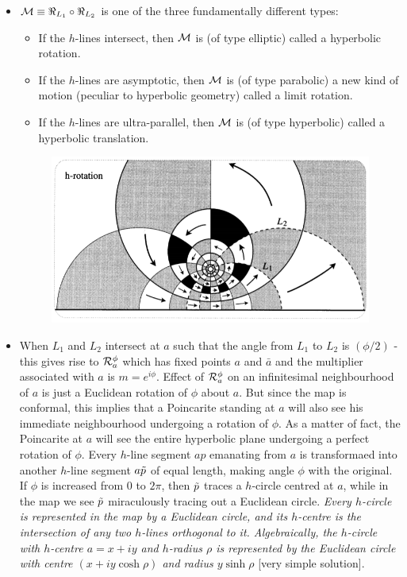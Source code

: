 \documentclass[12pt]{article}
\def\tt{\textit}
\def\mc{\ensuremath\mathcal}
\def\td{\ensuremath\tilde}
\begin{document}
\begin{itemize}
    \item $\mc{M} \equiv \Re_{L_1} \circ \Re_{L_2}$ is one of the three fundamentally different types:
    
    \begin{itemize}
        \item If the $h$-lines intersect, then $\mc{M}$ is (of type elliptic) called a hyperbolic rotation.

        \item If the $h$-lines are asymptotic, then $\mc{M}$ is (of type parabolic) a new kind of motion (peculiar to hyperbolic geometry) called a limit rotation.

        \item If the $h$-lines are ultra-parallel, then $\mc{M}$ is (of type hyperbolic) called a hyperbolic translation.
    \end{itemize}

    \begin{figure}[h!]
        \centering
        \includegraphics[scale=0.7]{fig_21}
        \label{fig_21}
    \end{figure}

    \item When $L_1$ and $L_2$ intersect at $a$ such that the angle from $L_1$ to $L_2$ is $(\phi/2)$ - this gives rise to $\mc{R}_{a}^{\phi}$ which has fixed points $a$ and $\bar{a}$ and the multiplier associated with $a$ is $m=e^{i\phi}$. Effect of $\mc{R}_{a}^{\phi}$ on an infinitesimal neighbourhood of $a$ is just a Euclidean rotation of $\phi$ about $a$. But since the map is conformal, this implies that a Poincarite standing at $a$ will also see his immediate neighbourhood undergoing a rotation of $\phi$. As a matter of fact, the Poincarite at $a$ will see the entire hyperbolic plane undergoing a perfect rotation of $\phi$. Every $h$-line segment $ap$ emanating from $a$ is transformaed into another $h$-line segment $a\td{p}$ of equal length, making angle $\phi$ with the original. If $\phi$ is increased from $0$ to $2\pi$, then $\td{p}$ traces a $h$-circle centred at $a$, while in the map we see $\td{p}$ miraculously tracing out a Euclidean circle. \tt{Every $h$-circle is represented in the map by a Euclidean circle, and its $h$-centre is the intersection of any two $h$-lines orthogonal to it. Algebraically, the $h$-circle with $h$-centre $a=x+iy$ and $h$-radius $\rho$ is represented by the Euclidean circle with centre $(x+iy\cosh \rho)$ and radius $y\sinh \rho$} [very simple solution].


\end{itemize}
\end{document}
